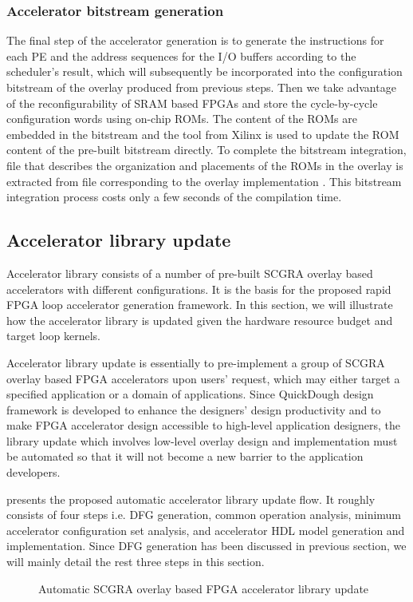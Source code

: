 \subsubsection{Accelerator bitstream generation}
The final step of the accelerator generation is to generate 
the instructions for each PE and the address sequences for the 
I/O buffers according to the scheduler's result, which will subsequently 
be incorporated into the configuration bitstream of the overlay produced 
from previous steps. Then we take advantage of the reconfigurability 
of SRAM based FPGAs and store the cycle-by-cycle configuration words 
using on-chip ROMs. The content of the ROMs are embedded in the 
bitstream and the  tool from Xilinx \cite{data2mem} is 
used to update the ROM content of the pre-built bitstream directly. 
To complete the bitstream integration,  file that describes 
the organization and placements of the ROMs in the overlay is extracted 
from  file corresponding to the overlay implementation \cite{beckhoff2011xilinx}.
This bitstream integration process costs only a few seconds of the compilation time.

\subsection{Accelerator library update} 
Accelerator library consists of a number of pre-built SCGRA overlay based accelerators with
different configurations. It is the basis for the proposed rapid FPGA loop accelerator generation
framework. In this section, we will illustrate how the accelerator library is updated
given the hardware resource budget and target loop kernels.

Accelerator library update is essentially to pre-implement a group of SCGRA overlay based FPGA
accelerators upon users' request, which may either target a specified application or a domain of
applications. Since QuickDough design framework is developed to enhance the
designers' design productivity and to make FPGA accelerator design accessible to high-level
application designers, the library update which involves low-level overlay design and implementation
must be automated so that it will not become a new barrier to the application developers.

 presents the proposed automatic accelerator library update flow. It
roughly consists of four steps i.e. DFG generation, common operation analysis, minimum accelerator
configuration set analysis, and accelerator HDL model generation and implementation. Since DFG generation
has been discussed in previous section, we will mainly detail the rest three steps in this section.
\begin{figure}
\caption{Automatic SCGRA overlay based FPGA accelerator library update}
\label{fig:auto-lib-gen}
\end{figure}

